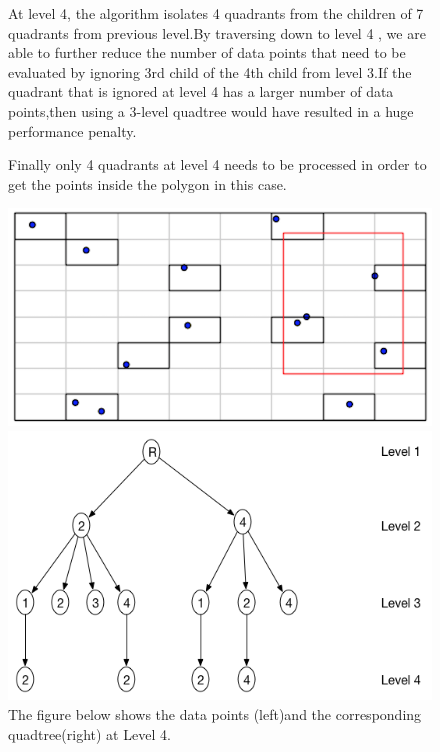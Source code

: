 \documentclass{article}
\begin{document}
\begin{figure}[ht]
At level 4, the algorithm isolates 4 quadrants from the children of 7 quadrants from previous level.By traversing down to level 4 , we are able to further reduce the number of data points that need to be evaluated by ignoring 3rd child of the 4th child from level 3.If the quadrant that is ignored at level 4 has a larger number of data points,then using a 3-level quadtree would have resulted in a huge performance penalty.

Finally only 4 quadrants at level 4 needs to be processed in order to get the points inside the polygon in this case.
\caption{The figure below shows the data points (left)and the corresponding quadtree(right) at Level 4.}
  \centering
  \begin{minipage}[b]{0.35\textwidth}
    \includegraphics[width=\textwidth]{2Quad_4}  
  \end{minipage}
  \hfill
  \begin{minipage}[b]{0.6\textwidth}
    \includegraphics[width=\textwidth]{2Quad_4_tree}
  \end{minipage}
\end{figure}
\end{document}
